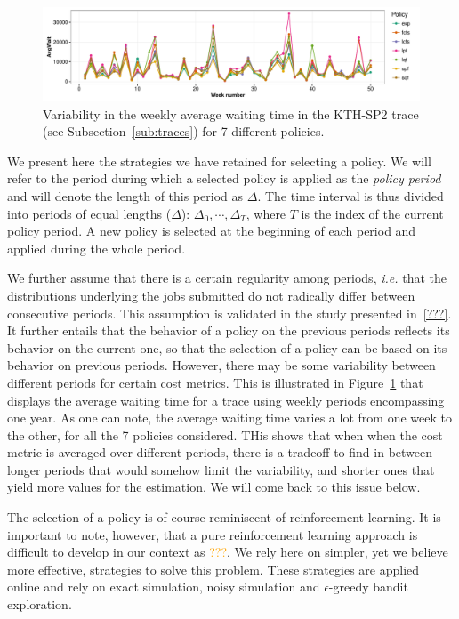 \documentclass[sigconf]{acmart}
\begin{document}
\begin{figure}[ht]
  \centering
  \includegraphics[scale=0.6]{figures/variability.pdf}
  \caption{Variability in the weekly average waiting time in the KTH-SP2 trace (see Subsection~\ref{sub:traces}) for 7 different policies.}
  \label{fig:mosn}
\end{figure}

We present here the strategies we have retained for selecting a policy. We will refer to the period during which a selected policy is applied as the \textit{policy period} and will denote the length of this period as $\Delta$. The time interval is thus divided into periods of equal lengths ($\Delta$): $\Delta_0, \cdots, \Delta_T$, where $T$ is the index of the current policy period. A new policy is selected at the beginning of each period and applied during the whole period.

We further assume that there is a certain regularity among periods, \textit{i.e.} that the distributions underlying the jobs submitted do not radically differ between consecutive periods. This assumption is validated in the study presented in~\ref{???}. It further entails that the behavior of a policy on the previous periods reflects its behavior on the current one, so that the selection of a policy can be based on its behavior on previous periods. However, there may be some variability between different periods for certain cost metrics. This is illustrated in Figure~\ref{fig:mosn} that displays the average waiting time for a trace using weekly periods encompassing one year. As one can note, the average waiting time varies a lot from one week to the other, for all the 7 policies considered. THis shows that when when the cost metric is averaged over different periods, there is a tradeoff to find in between longer periods that would somehow limit the variability, and shorter ones that yield more values for the estimation. We will come back to this issue below.

The selection of a policy is of course reminiscent of reinforcement learning. It is important to note, however, that a pure reinforcement learning approach is difficult to develop in our context as \textcolor{orange}{???}. We rely here on simpler, yet we believe more effective, strategies to solve this problem. These strategies are applied online and rely on exact simulation, noisy simulation and $\epsilon$-greedy bandit exploration.
\end{document}
